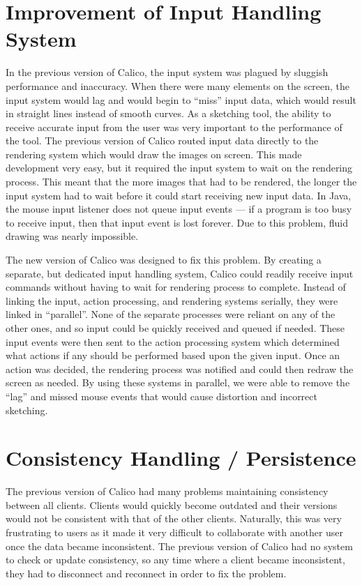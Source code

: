 \section{Improvement of Input Handling System}
In the previous version of Calico, the input system was plagued by sluggish performance and inaccuracy. When there were many elements on the screen, the input system would lag and would begin to ``miss'' input data, which would result in straight lines instead of smooth curves. As a sketching tool, the ability to receive accurate input from the user was very important to the performance of the tool. The previous version of Calico routed input data directly to the rendering system which would draw the images on screen. This made development very easy, but it required the input system to wait on the rendering process. This meant that the more images that had to be rendered, the longer the input system had to wait before it could start receiving new input data. In Java, the mouse input listener does not queue input events --- if a program is too busy to receive input, then that input event is lost forever. Due to this problem, fluid drawing was nearly impossible.   

The new version of Calico was designed to fix this problem. By creating a separate, but dedicated input handling system, Calico could readily receive input commands without having to wait for rendering process to complete.
Instead of linking the input, action processing, and rendering systems serially, they were linked in ``parallel''. None of the separate processes were reliant on any of the other ones, and so input could be quickly received and queued if needed. These input events were then sent to the action processing system which determined what actions if any should be performed based upon the given input. Once an action was decided, the rendering process was notified and could then redraw the screen as needed. By using these systems in parallel, we were able to remove the ``lag'' and missed mouse events that would cause distortion and incorrect sketching.


\section{Consistency Handling / Persistence}
The previous version of Calico had many problems maintaining consistency between all clients. Clients would quickly become outdated and their versions would not be consistent with that of the other clients. Naturally, this was very frustrating to users as it made it very difficult to collaborate with another user once the data became inconsistent. The previous version of Calico had no system to check or update consistency, so any time where a client became inconsistent, they had to disconnect and reconnect in order to fix the problem.


